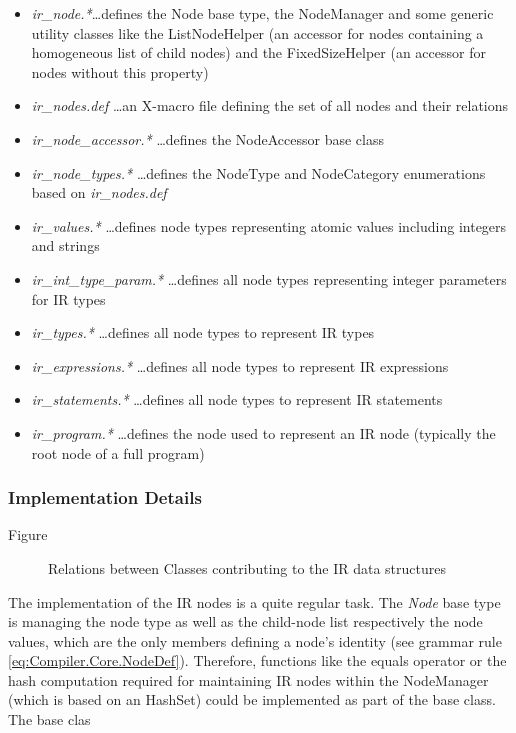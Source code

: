 \begin{itemize}
  \item \textit{ir\_node.*}\ldots defines the Node base type, the NodeManager
  and some generic utility classes like the ListNodeHelper (an accessor for
  nodes containing a homogeneous list of child nodes) and the FixedSizeHelper
  (an accessor for nodes without this property)
  \item \textit{ir\_nodes.def} \ldots an X-macro file defining the set of all
  nodes and their relations
  \item \textit{ir\_node\_accessor.*} \dots defines the NodeAccessor base class
  \item \textit{ir\_node\_types.*} \ldots defines the NodeType and NodeCategory
  enumerations based on \textit{ir\_nodes.def}
  \item \textit{ir\_values.*} \dots defines node types representing atomic
  values including integers and strings
  \item \textit{ir\_int\_type\_param.*} \ldots defines all node types
  representing integer parameters for IR types
  \item \textit{ir\_types.*} \ldots defines all node types to represent IR types
  \item \textit{ir\_expressions.*} \ldots defines all node types to represent IR
  expressions
  \item \textit{ir\_statements.*} \ldots defines all node types to represent IR
  statements
  \item \textit{ir\_program.*} \ldots defines the node used to represent an IR
  node (typically the root node of a full program)
\end{itemize}


\subsubsection{Implementation Details}
Figure 

\begin{figure}[h]

	\label{fig:Compiler.Core.ClassRelation}
	\caption{Relations between Classes contributing to the IR data structures}
\end{figure}


The implementation of the IR nodes is a quite regular task. The \textit{Node}
base type is managing the node type as well as the child-node list respectively
the node values, which are the only members defining a node's identity (see
grammar rule \ref{eq:Compiler.Core.NodeDef}). Therefore, functions like the
equals operator or the hash computation required for maintaining IR nodes
within the NodeManager (which is based on an HashSet) could be implemented
as part of the base class. The base clas

